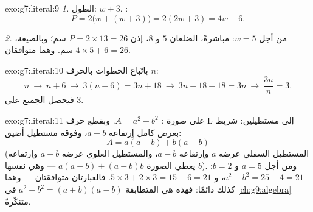 \begin{solution}{exo:g7:literal:9}
\emph{1.} الطول: $w + 3$. :
\[
P = 2\bigl(w + (w + 3)\bigr) = 2(2w + 3) = 4w + 6 .
\]

\emph{2.} من أجل $w = 5$: مباشرةً، الضلعان $5$ و $8$، إذن
$P = 2 \times 13 = 26$ سم؛ وبالصيغة، $4 \times 5 + 6 = 26$ سم.
وهما متوافقان.
\end{solution}

\begin{solution}{exo:g7:literal:10}
باتّباع الخطوات بالحرف $n$:
\[
n \ \to\ n + 6 \ \to\ 3(n + 6) = 3n + 18 \ \to\ 3n + 18 - 18 = 3n
\ \to\ \frac{3n}{n} = 3 .
\]
فيحصل الجميع على $3$.
\end{solution}

\begin{solution}{exo:g7:literal:11}
على صورة : $A = a^2 - b^2$. وبقطع حرف L إلى مستطيلين:
شريط بعرض كامل اِرتفاعه $a - b$، وفوقه
مستطيل أضيق:
\[
A = a(a - b) + b(a - b)
\]
(المستطيل السفلي عرضه $a$ واِرتفاعه $a - b$، والمستطيل العلوي عرضه $a - b$
واِرتفاعه $b$ يعطي الصورة $a(a-b) + (a-b)b$ --- وهي نفسها).
ومن أجل $a = 5$ و $b = 2$: $a^2 - b^2 = 25 - 4 = 21$، و
$5 \times 3 + 2 \times 3 = 15 + 6 = 21$. فالعبارتان متوافقتان ---
وهما كذلك دائمًا: فهذه هي المتطابقة $a^2 - b^2 = (a + b)(a - b)$ في
\cref{ch:g9:algebra} متنكّرةً.
\end{solution}

